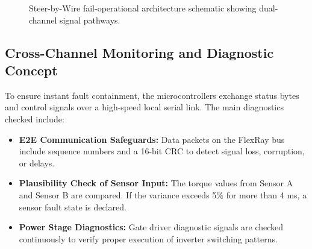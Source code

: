 \begin{figure}[H]
    \caption{Steer-by-Wire fail-operational architecture schematic showing dual-channel signal pathways.}
    \label{fig:sbw_architecture}
\end{figure}

\subsection{Cross-Channel Monitoring and Diagnostic Concept}
To ensure instant fault containment, the microcontrollers exchange status bytes and control signals over a high-speed local serial link. The main diagnostics checked include:
\begin{itemize}
    \item \textbf{E2E Communication Safeguards:} Data packets on the FlexRay bus include sequence numbers and a 16-bit CRC to detect signal loss, corruption, or delays.
    \item \textbf{Plausibility Check of Sensor Input:} The torque values from Sensor A and Sensor B are compared. If the variance exceeds 5\% for more than 4 ms, a sensor fault state is declared.
    \item \textbf{Power Stage Diagnostics:} Gate driver diagnostic signals are checked continuously to verify proper execution of inverter switching patterns.
\end{itemize}

